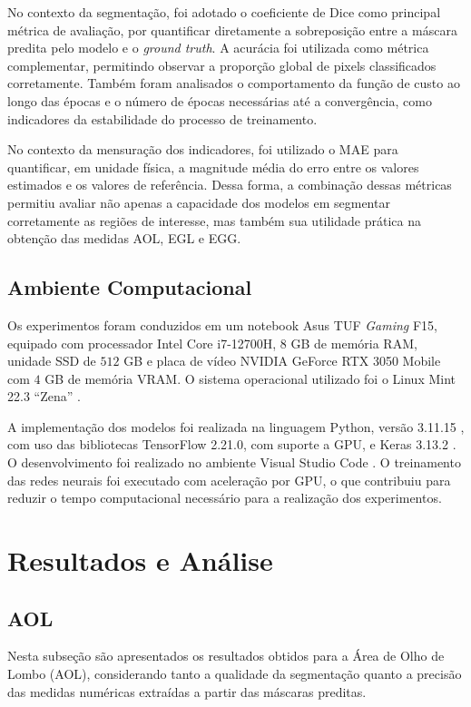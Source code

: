 No contexto da segmentação, foi adotado o coeficiente de Dice como principal métrica de avaliação, por quantificar diretamente a sobreposição entre a máscara predita pelo modelo e o \textit{ground truth}. A acurácia foi utilizada como métrica complementar, permitindo observar a proporção global de pixels classificados corretamente. Também foram analisados o comportamento da função de custo ao longo das épocas e o número de épocas necessárias até a convergência, como indicadores da estabilidade do processo de treinamento.

No contexto da mensuração dos indicadores, foi utilizado o MAE para quantificar, em unidade física, a magnitude média do erro entre os valores estimados e os valores de referência. Dessa forma, a combinação dessas métricas permitiu avaliar não apenas a capacidade dos modelos em segmentar corretamente as regiões de interesse, mas também sua utilidade prática na obtenção das medidas AOL, EGL e EGG.

\subsection{Ambiente Computacional}

Os experimentos foram conduzidos em um notebook Asus TUF \textit{Gaming} F15, equipado com processador Intel Core i7-12700H, $8$ GB de memória RAM, unidade SSD de $512$ GB e placa de vídeo NVIDIA GeForce RTX 3050 Mobile com $4$ GB de memória VRAM. O sistema operacional utilizado foi o Linux Mint 22.3 ``Zena'' \cite{LinuxMintSite}.

A implementação dos modelos foi realizada na linguagem Python, versão 3.11.15 \cite{python}, com uso das bibliotecas TensorFlow 2.21.0, com suporte a GPU, e Keras 3.13.2 \cite{TensorFlowSite, KerasSite}. O desenvolvimento foi realizado no ambiente Visual Studio Code \cite{VSCodeSite}. O treinamento das redes neurais foi executado com aceleração por GPU, o que contribuiu para reduzir o tempo computacional necessário para a realização dos experimentos.


\section{Resultados e Análise}
\subsection{AOL}
Nesta subseção são apresentados os resultados obtidos para a Área de Olho de Lombo (AOL), considerando tanto a qualidade da segmentação quanto a precisão das medidas numéricas extraídas a partir das máscaras preditas.

